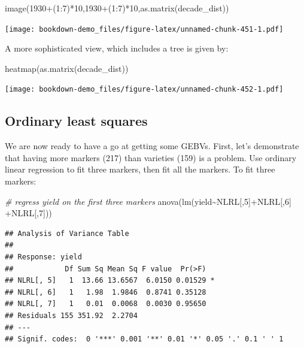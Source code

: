 \documentclass[
]{book}
\newenvironment{Shaded}{\begin{snugshade}}{\end{snugshade}}
\newcommand{\CommentTok}[1]{\textcolor[rgb]{0.56,0.35,0.01}{\textit{#1}}}
\newcommand{\DecValTok}[1]{\textcolor[rgb]{0.00,0.00,0.81}{#1}}
\newcommand{\FunctionTok}[1]{\textcolor[rgb]{0.00,0.00,0.00}{#1}}
\newcommand{\NormalTok}[1]{#1}
\newcommand{\SpecialCharTok}[1]{\textcolor[rgb]{0.00,0.00,0.00}{#1}}
\begin{document}
\begin{Shaded}
\begin{Highlighting}[]
\FunctionTok{image}\NormalTok{(}\DecValTok{1930}\SpecialCharTok{+}\NormalTok{(}\DecValTok{1}\SpecialCharTok{:}\DecValTok{7}\NormalTok{)}\SpecialCharTok{*}\DecValTok{10}\NormalTok{,}\DecValTok{1930}\SpecialCharTok{+}\NormalTok{(}\DecValTok{1}\SpecialCharTok{:}\DecValTok{7}\NormalTok{)}\SpecialCharTok{*}\DecValTok{10}\NormalTok{,}\FunctionTok{as.matrix}\NormalTok{(decade\_dist))}
\end{Highlighting}
\end{Shaded}

\texttt{[image: bookdown-demo\_files/figure-latex/unnamed-chunk-451-1.pdf]}

A more sophisticated view, which includes a tree is given by:

\begin{Shaded}
\begin{Highlighting}[]
\FunctionTok{heatmap}\NormalTok{(}\FunctionTok{as.matrix}\NormalTok{(decade\_dist))}
\end{Highlighting}
\end{Shaded}

\texttt{[image: bookdown-demo\_files/figure-latex/unnamed-chunk-452-1.pdf]}

\hypertarget{ordinary-least-squares}{%
\subsection{Ordinary least squares}\label{ordinary-least-squares}}

We are now ready to have a go at getting some GEBVs. First, let's demonstrate that having
more markers (217) than varieties (159) is a problem. Use ordinary linear regression to fit
three markers, then fit all the markers. To fit three markers:

\begin{Shaded}
\begin{Highlighting}[]
\CommentTok{\# regress yield on the first three markers}
\FunctionTok{anova}\NormalTok{(}\FunctionTok{lm}\NormalTok{(yield}\SpecialCharTok{\textasciitilde{}}\NormalTok{NLRL[,}\DecValTok{5}\NormalTok{]}\SpecialCharTok{+}\NormalTok{NLRL[,}\DecValTok{6}\NormalTok{] }\SpecialCharTok{+}\NormalTok{NLRL[,}\DecValTok{7}\NormalTok{]))}
\end{Highlighting}
\end{Shaded}

\begin{verbatim}
## Analysis of Variance Table
## 
## Response: yield
##            Df Sum Sq Mean Sq F value  Pr(>F)  
## NLRL[, 5]   1  13.66 13.6567  6.0150 0.01529 *
## NLRL[, 6]   1   1.98  1.9846  0.8741 0.35128  
## NLRL[, 7]   1   0.01  0.0068  0.0030 0.95650  
## Residuals 155 351.92  2.2704                  
## ---
## Signif. codes:  0 '***' 0.001 '**' 0.01 '*' 0.05 '.' 0.1 ' ' 1
\end{verbatim}
\end{document}
